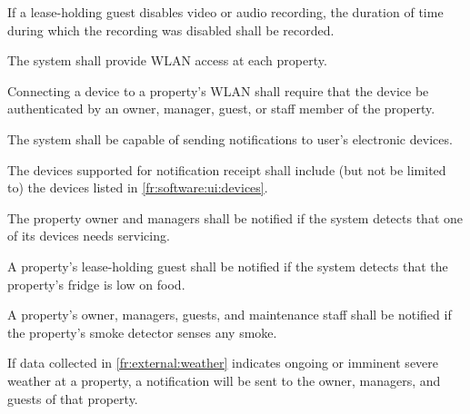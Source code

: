 \documentclass[letter,titlepage,oneside,english]{report}
\begin{document}
\begin{fr}
\begin{fr}
\begin{fr}
    \item
      If a lease-holding guest disables video or audio recording, the duration of time during which the recording was disabled shall be recorded.
    \end{fr}
  \end{fr}
\item
  The system shall provide WLAN access at each property.
  \begin{fr}
  \item
    Connecting a device to a property's WLAN shall require that the device be authenticated by an owner, manager, guest, or staff member of the property.
  \end{fr}
\item
  The system shall be capable of sending notifications to user's electronic devices.
  \begin{fr}
  \item
    The devices supported for notification receipt shall include (but not be limited to) the devices listed in \ref{fr:software:ui:devices}.
  \item
    The property owner and managers shall be notified if the system detects that one of its devices needs servicing.
  \item
    A property's lease-holding guest shall be notified if the system detects that the property's fridge is low on food.
  \item
    A property's owner, managers, guests, and maintenance staff shall be notified if the property's smoke detector senses any smoke.
  \item
    If data collected in \ref{fr:external:weather} indicates ongoing or imminent severe weather at a property, a notification will be sent to the owner, managers, and guests of that property.
  \end{fr}
\end{fr}
\end{document}
